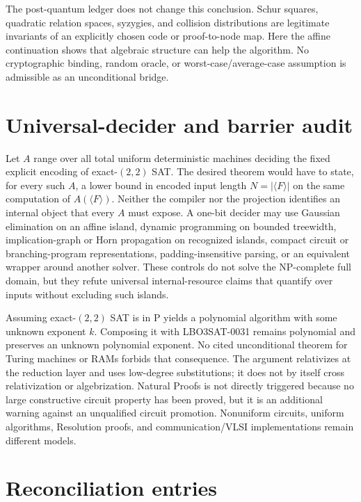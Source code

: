 \documentclass[11pt]{article}
\begin{document}
The post-quantum ledger does not change this conclusion.  Schur squares,
quadratic relation spaces, syzygies, and collision distributions are legitimate
invariants of an explicitly chosen code or proof-to-node map.  Here the affine
continuation shows that algebraic structure can help the algorithm.  No
cryptographic binding, random oracle, or worst-case/average-case assumption is
admissible as an unconditional bridge.

\section{Universal-decider and barrier audit}

Let $A$ range over all total uniform deterministic machines deciding the fixed
explicit encoding of exact-$(2,2)$ SAT.  The desired theorem would have to
state, for every such $A$, a lower bound in encoded input length
$N=|\langle F\rangle|$ on the same computation of $A(\langle F\rangle)$.
Neither the compiler nor the projection identifies an internal object that
every $A$ must expose.  A one-bit decider may use Gaussian elimination on an
affine island, dynamic programming on bounded treewidth, implication-graph or
Horn propagation on recognized islands, compact circuit or branching-program
representations, padding-insensitive parsing, or an equivalent wrapper around
another solver.  These controls do not solve the NP-complete full domain, but
they refute universal internal-resource claims that quantify over inputs
without excluding such islands.

Assuming exact-$(2,2)$ SAT is in P yields a polynomial algorithm with some
unknown exponent $k$.  Composing it with LBO3SAT-0031 remains polynomial and
preserves an unknown polynomial exponent.  No cited unconditional theorem
for Turing machines or RAMs forbids that consequence.  The argument
relativizes at the reduction layer and uses low-degree substitutions; it does
not by itself cross relativization or algebrization.  Natural Proofs is not
directly triggered because no large constructive circuit property has been
proved, but it is an additional warning against an unqualified circuit
promotion.  Nonuniform circuits, uniform algorithms, Resolution proofs, and
communication/VLSI implementations remain different models.

\section{Reconciliation entries}
\end{document}
